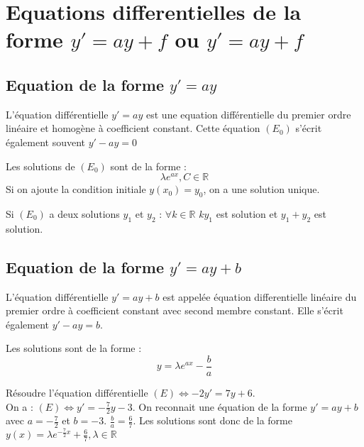 \section{Equations differentielles de la forme \(y' = ay+f\) ou \(y' = ay+f\)}
\subsection{Equation de la forme \(y' = ay\) }
L'équation différentielle \(y' = ay\) est une equation différentielle du premier ordre linéaire et homogène à coefficient constant. Cette équation \((E_{0})\) s'écrit également souvent \(y'-ay = 0\)
\begin{corollary}[Propriétés]\label{col:sol_1}
    Les solutions de \((E_0)\) sont de la forme : 
    \[
        \lambda e^{ax}, C \in \mathbb{R}
    \] 
    Si on ajoute la condition initiale \(y(x_{0}) = y_{0}\), on a une solution unique.
\end{corollary} 

\begin{corollary}[Propriété]\label{col:homo}
    Si \((E_{0})\) a deux solutions \(y_{1}\) et \(y_{2}\) : \(\forall k \in \mathbb{R}\) \(ky_{1}\) est solution et \(y_{1}+y_{2}\) est solution.      
\end{corollary}
\subsection{Equation de la forme \(y' = ay + b\) }

L'équation différentielle \(y' = ay+b\) est appelée équation differentielle linéaire du premier ordre à coefficient constant avec second membre constant. Elle s'écrit également \(y'-ay = b\).\\ 
\begin{corollary}[Propriétés]\label{col:sol_2}
    Les solutions sont de la forme : 
    \[
        y = \lambda e^{ax} -\frac{b}{a}
    \]
\end{corollary}

\begin{eg}[Exemple]\label{eg:resol_1}
    Résoudre l'équation différentielle \((E) \iff -2y' = 7y+6\).\\
    On a : \((E) \iff y' = -\frac{7}{2}y -3\). On reconnait une équation de la forme \(y' = ay+b \) avec \(a=-\frac{7}{2}\) et \(b = -3\). \(\frac{b}{a} = \frac{6}{7}\). Les solutions sont donc de la forme \(y(x) = \lambda e^{-\frac{7}{2}x}+ \frac{6}{7}, \lambda \in \mathbb{R}\)
\end{eg}